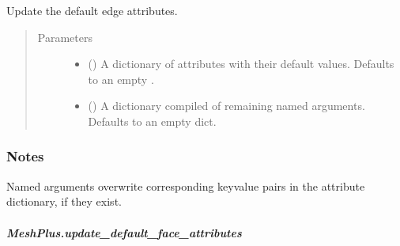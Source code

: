 \documentclass[letterpaper,10pt,english]{sphinxmanual}
\begin{document}
\begin{fulllineitems}
\begin{fulllineitems}
\label{\detokenize{api/generated/directional_clustering.mesh.MeshPlus.update_default_edge_attributes:directional_clustering.mesh.MeshPlus.update_default_edge_attributes}}
Update the default edge attributes.
\begin{quote}\begin{description}
\item[{Parameters}] \leavevmode\begin{itemize}
\item {} 
 () \textendash{} A dictionary of attributes with their default values.
Defaults to an empty .

\item {} 
 () \textendash{} A dictionary compiled of remaining named arguments.
Defaults to an empty dict.

\end{itemize}

\end{description}\end{quote}
\subsubsection*{Notes}

Named arguments overwrite corresponding key\sphinxhyphen{}value pairs in the attribute dictionary,
if they exist.

\end{fulllineitems}



\subparagraph{MeshPlus.update\_default\_face\_attributes}
\label{\detokenize{api/generated/directional_clustering.mesh.MeshPlus.update_default_face_attributes:meshplus-update-default-face-attributes}}\label{\detokenize{api/generated/directional_clustering.mesh.MeshPlus.update_default_face_attributes::doc}}


\end{fulllineitems}
\end{document}
